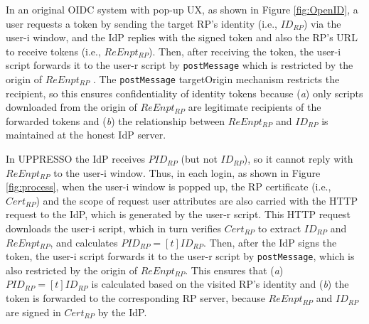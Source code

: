 In an original OIDC system with pop-up UX, as shown in Figure \ref{fig:OpenID},
    a user requests a token by sending the target RP's identity (i.e., $ID_{RP}$) via the user-i window,
    and the IdP replies with the signed token and also the RP's URL to receive tokens (i.e., $ReEnpt_{RP}$).
Then, after receiving the token, the user-i script forwards it to the user-r script by \verb+postMessage+
    which is restricted by the origin of $ReEnpt_{RP}$ \cite{SPRESSO,MITREid,BrowserID,GoogleIdIntegrate,de2014oauth,OpenIDConnect}.
The \verb+postMessage+ targetOrigin mechanism \cite{postm-targeto} restricts the recipient,
so this ensures confidentiality of identity tokens because (\emph{a}) only scripts downloaded from the origin of $ReEnpt_{RP}$ are legitimate recipients of the forwarded tokens
    and (\emph{b}) the relationship between $ReEnpt_{RP}$ and $ID_{RP}$ is maintained at the honest IdP server.

In UPPRESSO the IdP receives $PID_{RP}$ (but not $ID_{RP}$),
    so it cannot reply with $ReEnpt_{RP}$ to the user-i window.
%
%
Thus, in each login, 
as shown in Figure \ref{fig:process},
when the user-i window is popped up,
    the RP certificate (i.e., $Cert_{RP}$) and the scope of request user attributes are also carried with the HTTP request to the IdP,
    which is generated by the user-r script.
This HTTP request downloads the user-i script,
    which in turn verifies $Cert_{RP}$ to extract $ID_{RP}$ and $ReEnpt_{RP}$, and calculates $PID_{RP} = [t]ID_{RP}$. %
Then, after the IdP signs the token,
    the user-i script forwards it to the user-r script by \verb+postMessage+,
    which is also restricted by the origin of $ReEnpt_{RP}$.
This ensures that (\emph{a}) $PID_{RP} = [t]{ID_{RP}}$ is calculated based on the visited RP's identity and (\emph{b}) the token is forwarded to the corresponding RP server,
    because $ReEnpt_{RP}$ and $ID_{RP}$ are signed in $Cert_{RP}$ by the IdP.

